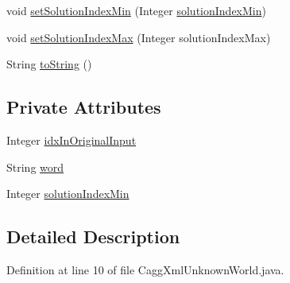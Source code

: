 \begin{DoxyCompactItemize}
\item 
void \hyperlink{classit_1_1emarolab_1_1cagg_1_1debugging_1_1result2XML_1_1CaggXmlUnknownWorld_a87f9de4ab53bc5442531e18de9f95e1c}{set\-Solution\-Index\-Min} (Integer \hyperlink{classit_1_1emarolab_1_1cagg_1_1debugging_1_1result2XML_1_1CaggXmlUnknownWorld_ae0d33ee2fe46320439eba9d0ea0450d5}{solution\-Index\-Min})
\item 
void \hyperlink{classit_1_1emarolab_1_1cagg_1_1debugging_1_1result2XML_1_1CaggXmlUnknownWorld_ac91887b0251215879d6a5bc282444b51}{set\-Solution\-Index\-Max} (Integer solution\-Index\-Max)
\item 
String \hyperlink{classit_1_1emarolab_1_1cagg_1_1debugging_1_1result2XML_1_1CaggXmlUnknownWorld_a27b7e1bbd2bb7bae025317e5f20fe7d2}{to\-String} ()
\end{DoxyCompactItemize}
\subsection*{Private Attributes}
\begin{DoxyCompactItemize}
\item 
Integer \hyperlink{classit_1_1emarolab_1_1cagg_1_1debugging_1_1result2XML_1_1CaggXmlUnknownWorld_a77233b425389b01186a275f30d9b75b2}{idx\-In\-Original\-Input}
\item 
String \hyperlink{classit_1_1emarolab_1_1cagg_1_1debugging_1_1result2XML_1_1CaggXmlUnknownWorld_a26bce6329474f319129e5c3624741075}{word}
\item 
Integer \hyperlink{classit_1_1emarolab_1_1cagg_1_1debugging_1_1result2XML_1_1CaggXmlUnknownWorld_ae0d33ee2fe46320439eba9d0ea0450d5}{solution\-Index\-Min}
\end{DoxyCompactItemize}


\subsection{Detailed Description}


Definition at line 10 of file Cagg\-Xml\-Unknown\-World.\-java.




